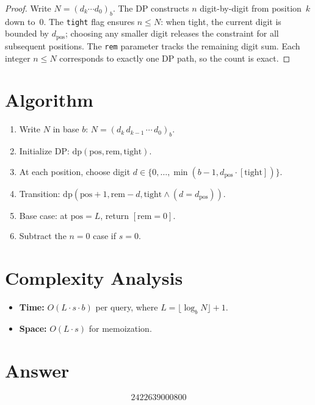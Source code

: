 \documentclass[11pt]{article}
\begin{document}
\begin{proof}
Write $N = (d_k \cdots d_0)_b$. The DP constructs $n$ digit-by-digit from position~$k$ down to~$0$. The \texttt{tight} flag ensures $n \leq N$: when tight, the current digit is bounded by $d_{\mathrm{pos}}$; choosing any smaller digit releases the constraint for all subsequent positions. The \texttt{rem} parameter tracks the remaining digit sum. Each integer $n \leq N$ corresponds to exactly one DP path, so the count is exact.
\end{proof}

\section{Algorithm}

\begin{enumerate}
    \item Write $N$ in base $b$: $N = (d_k \, d_{k-1} \, \cdots \, d_0)_b$.
    \item Initialize DP: $\mathrm{dp}(\mathrm{pos}, \mathrm{rem}, \mathrm{tight})$.
    \item At each position, choose digit $d \in \{0, \ldots, \min(b-1, d_{\mathrm{pos}} \cdot [\mathrm{tight}])\}$.
    \item Transition: $\mathrm{dp}(\mathrm{pos}+1, \mathrm{rem}-d, \mathrm{tight} \land (d = d_{\mathrm{pos}}))$.
    \item Base case: at $\mathrm{pos} = L$, return $[\mathrm{rem} = 0]$.
    \item Subtract the $n = 0$ case if $s = 0$.
\end{enumerate}

\section{Complexity Analysis}

\begin{itemize}
    \item \textbf{Time:} $O(L \cdot s \cdot b)$ per query, where $L = \lfloor \log_b N \rfloor + 1$.
    \item \textbf{Space:} $O(L \cdot s)$ for memoization.
\end{itemize}

\section{Answer}

\[
\boxed{2422639000800}
\]
\end{document}
